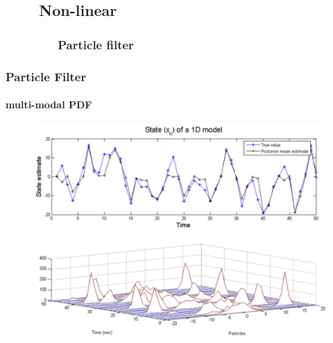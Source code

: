 \subsection{\ \ \ \ Non-linear}

\subsubsection{\ \ \ \ \ \ \ \ Particle filter}
\begin{frame}
\frametitle{Particle Filter}
\framesubtitle{multi-modal PDF}
\logoCSIPCPL\mypagenum
	\begin{figure}
		\includegraphics[width=1.0\textwidth]{figs/TRK_ParticleFilter_multimodalPDF.pdf}
	\end{figure}	
\end{frame}




